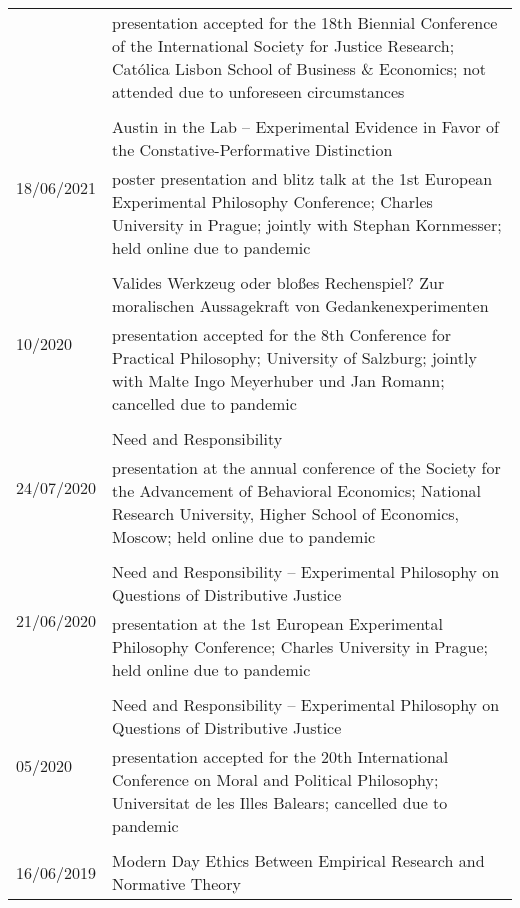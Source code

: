 \documentclass[a4paper,10pt]{article}
\begin{document}
\begin{longtable}{p{2.5cm}p{11cm}}
& \footnotesize{presentation accepted for the 18th Biennial Conference of the International Society for Justice Research; Católica Lisbon School of Business \& Economics; not attended due to unforeseen circumstances}\\
\\
\multirow{2}{2.5cm}{\footnotesize{18/06/2021}} & Austin in the Lab -- Experimental Evidence in Favor of the Constative-Performative Distinction\\
& \footnotesize{poster presentation and blitz talk at the 1st European Experimental Philosophy Conference; Charles University in Prague; jointly with Stephan Kornmesser; held online due to pandemic}\\
\\
\multirow{2}{2.5cm}{\footnotesize{10/2020}} & Valides Werkzeug oder bloßes Rechenspiel? Zur moralischen Aussagekraft von Gedankenexperimenten\\
& \footnotesize{presentation accepted for the 8th Conference for Practical Philosophy; University of Salzburg; jointly with Malte Ingo Meyerhuber und Jan Romann; cancelled due to pandemic}\\
\\
\multirow{2}{2.5cm}{\footnotesize{24/07/2020}} & Need and Responsibility\\
& \footnotesize{presentation at the annual conference of the Society for the Advancement of Behavioral Economics; National Research University, Higher School of Economics, Moscow; held online due to pandemic}\\
\\
\multirow{2}{2.5cm}{\footnotesize{21/06/2020}} & Need and Responsibility -- Experimental Philosophy on Questions of Distributive Justice\\
& \footnotesize{presentation at the 1st European Experimental Philosophy Conference; Charles University in Prague; held online due to pandemic}\\
\\
\multirow{2}{2.5cm}{\footnotesize{05/2020}} & Need and Responsibility -- Experimental Philosophy on Questions of Distributive Justice\\
& \footnotesize{presentation accepted for the 20th International Conference on Moral and Political Philosophy; Universitat de les Illes Balears; cancelled due to pandemic}\\
\\
\multirow{2}{2.5cm}{\footnotesize{16/06/2019}} & Modern Day Ethics Between Empirical Research and Normative Theory\\

\end{longtable}
\end{document}

